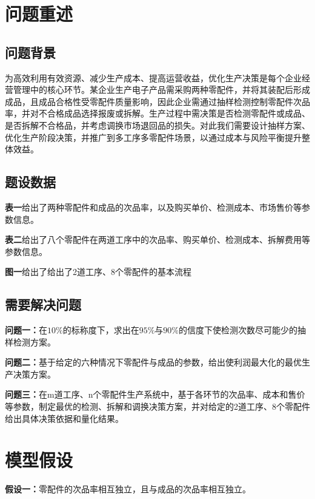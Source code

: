 \documentclass[withoutpreface,bwprint]{cumcmthesis}
\begin{document}

\section{问题重述}

\subsection{问题背景}
为高效利用有效资源、减少生产成本、提高运营收益，优化生产决策是每个企业经营管理中的核心环节。某企业生产电子产品需采购两种零配件，并将其装配后形成成品，且成品合格性受零配件质量影响，因此企业需通过抽样检测控制零配件次品率，并对不合格成品选择报废或拆解。生产过程中需决策是否检测零配件或成品、是否拆解不合格品，并考虑调换市场退回品的损失。对此我们需要设计抽样方案、优化生产阶段决策，并推广到多工序多零配件场景，以通过成本与风险平衡提升整体效益。


\subsection{题设数据}
\textbf{表一}给出了两种零配件和成品的次品率，以及购买单价、检测成本、市场售价等参数信息。

\textbf{表二}给出了八个零配件在两道工序中的次品率、购买单价、检测成本、拆解费用等参数信息。

\textbf{图一}给出了给出了2道工序、8个零配件的基本流程





\subsection{需要解决问题}

\textbf{问题一：}在$10\%$的标称度下，求出在$95\%$与$90\%$的信度下使检测次数尽可能少的抽样检测方案。

\textbf{问题二：}基于给定的六种情况下零配件与成品的参数，给出使利润最大化的最优生产决策方案。

\textbf{问题三：}在m道工序、n个零配件生产系统中，基于各环节的次品率、成本和售价等参数，制定最优的检测、拆解和调换决策方案，并对给定的2道工序、8个零配件给出具体决策依据和量化结果。



\section{模型假设}
\textbf{假设一：}零配件的次品率相互独立，且与成品的次品率相互独立。
\end{document}
